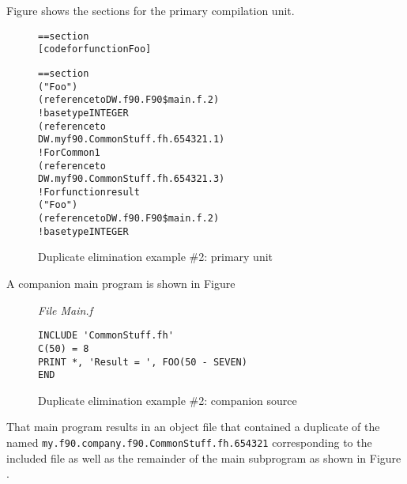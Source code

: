 Figure 
shows the sections for the primary compilation unit.

\begin{figure}
\begin{dwflisting}
\begin{alltt}
== section \dottext{}
    [code for function Foo]

== section \dotdebuginfo{}
            ("Foo")
            (reference to DW.f90.F90\$main.f.2)
                ! base type INTEGER
                (reference to
                    DW.myf90.CommonStuff.fh.654321.1)
             ! For Common1
                (reference to
                    DW.myf90.CommonStuff.fh.654321.3)
             ! For function result
                ("Foo")
                    (reference to DW.f90.F90\$main.f.2)
                        ! base type INTEGER
\end{alltt}
\end{dwflisting}
\caption{Duplicate elimination example \#2: primary unit}
\label{fig:duplicateeliminationexample2primaryunit}
\end{figure}

A companion main program is shown in 
Figure 

\begin{figure}
\textit{File Main.f} 
\begin{lstlisting}[numbers=none]
INCLUDE 'CommonStuff.fh'
C(50) = 8
PRINT *, 'Result = ', FOO(50 - SEVEN)
END
\end{lstlisting}
\caption{Duplicate elimination example \#2: companion source }
\label{fig:duplicateeliminationexample2companionsource}
\end{figure}

That main program results in an object file that
contained a duplicate of the  named
\texttt{my.f90.company.f90.CommonStuff.fh.654321} 
corresponding to the
included file as well as the remainder of the main subprogram
as shown in 
Figure .

